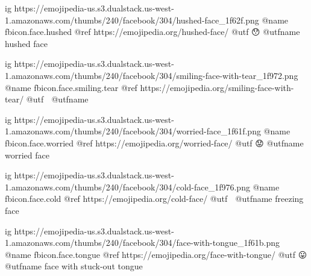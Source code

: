 	ig https://emojipedia-us.s3.dualstack.us-west-1.amazonaws.com/thumbs/240/facebook/304/hushed-face_1f62f.png
	@name fbicon.face.hushed
	@ref https://emojipedia.org/hushed-face/
	@utf 😯
	@utfname hushed face

	ig https://emojipedia-us.s3.dualstack.us-west-1.amazonaws.com/thumbs/240/facebook/304/smiling-face-with-tear_1f972.png
	@name fbicon.face.smiling.tear
	@ref https://emojipedia.org/smiling-face-with-tear/
	@utf 🥲
	@utfname

	ig https://emojipedia-us.s3.dualstack.us-west-1.amazonaws.com/thumbs/240/facebook/304/worried-face_1f61f.png
	@name fbicon.face.worried
	@ref https://emojipedia.org/worried-face/
	@utf 😟
	@utfname worried face

	ig https://emojipedia-us.s3.dualstack.us-west-1.amazonaws.com/thumbs/240/facebook/304/cold-face_1f976.png
	@name fbicon.face.cold
	@ref https://emojipedia.org/cold-face/
	@utf 🥶
	@utfname freezing face

	ig https://emojipedia-us.s3.dualstack.us-west-1.amazonaws.com/thumbs/240/facebook/304/face-with-tongue_1f61b.png
	@name fbicon.face.tongue
	@ref https://emojipedia.org/face-with-tongue/
	@utf 😛
	@utfname face with stuck-out tongue

\fi
